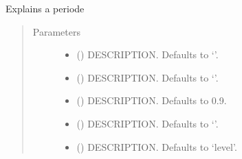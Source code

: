 \documentclass[letterpaper,10pt,english]{sphinxmanual}
\begin{document}
\begin{fulllineitems}
\begin{fulllineitems}
\label{\detokenize{attribution/modeldekom:modeldekom.totdif.explain_per}}
\pysigstartsignatures
{}
\pysigstopsignatures
\sphinxAtStartPar
Explains a periode
\begin{quote}\begin{description}
\item[{Parameters}] \leavevmode\begin{itemize}
\item {} 
\sphinxAtStartPar
{} (\sphinxstyleliteralemphasis{\sphinxupquote{, }}) \textendash{} DESCRIPTION. Defaults to ‘’.

\item {} 
\sphinxAtStartPar
{} (\sphinxstyleliteralemphasis{\sphinxupquote{, }}) \textendash{} DESCRIPTION. Defaults to ‘’.

\item {} 
\sphinxAtStartPar
{} (\sphinxstyleliteralemphasis{\sphinxupquote{, }}) \textendash{} DESCRIPTION. Defaults to 0.9.

\item {} 
\sphinxAtStartPar
{} (\sphinxstyleliteralemphasis{\sphinxupquote{, }}) \textendash{} DESCRIPTION. Defaults to ‘’.

\item {} 
\sphinxAtStartPar
{} (\sphinxstyleliteralemphasis{\sphinxupquote{, }}) \textendash{} DESCRIPTION. Defaults to ‘level’.


\end{itemize}
\end{description}
\end{quote}
\end{fulllineitems}
\end{fulllineitems}
\end{document}
